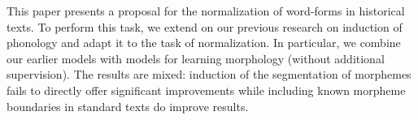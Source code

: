 This paper presents a proposal for the normalization of word-forms in historical texts. To perform this task, we extend on our previous research on induction of phonology and adapt it to the task of normalization. In particular, we combine our earlier models with models for learning morphology (without additional supervision). The results are mixed: induction of the segmentation of morphemes fails to directly offer significant improvements while including known morpheme boundaries in standard texts do improve results.
